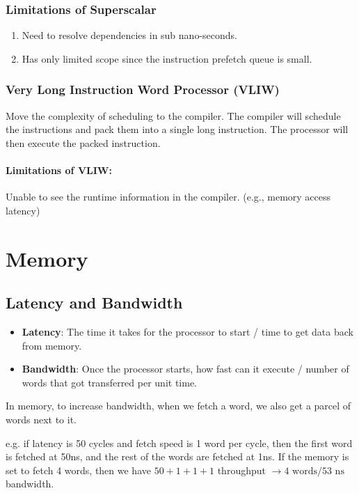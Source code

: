 \documentclass{../../ainote}
\begin{document}
\subsubsection{Limitations of Superscalar}
\begin{enumerate}[leftmargin=*]
    \item Need to resolve dependencies in sub nano-seconds.
    \item Has only limited scope since the instruction prefetch queue is small.
\end{enumerate}

\subsubsection{Very Long Instruction Word Processor (VLIW)}
Move the complexity of scheduling to the compiler. The compiler will schedule the instructions and pack them into a single long instruction. The processor will then execute the packed instruction.

\paragraph{Limitations of VLIW:}\mbox\\
Unable to see the runtime information in the compiler. (e.g., memory access latency)

\newpage

\section{Memory}

\subsection{Latency and Bandwidth}
\begin{itemize}[leftmargin=*]
    \item \textbf{Latency}: The time it takes for the processor to start / time to get data back from memory.
    \item \textbf{Bandwidth}: Once the processor starts, how fast can it execute / number of words that got transferred per unit time.
\end{itemize}

\begin{info}
    In memory, to increase bandwidth, when we fetch a word, we also get a parcel of words next to it.

    e.g. if latency is 50 cycles and fetch speed is 1 word per cycle, then the first word is fetched at 50ns, and the rest of the words are fetched at 1ns. If the memory is set to fetch 4 words, then we have $50+1+1+1$ throughput $\rightarrow 4\textrm{ words} /53\textrm{ ns}$ bandwidth.
\end{info}
\end{document}
